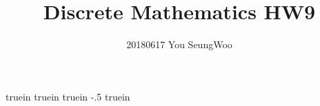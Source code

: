  truein 
 truein 
 truein 
\topmargin -.5 truein 
\textheight 8.5in
\setlength{\parindent}{0pt}
\hypersetup{
	colorlinks=true,
	linkcolor=red,
	filecolor=magenta,      
	urlcolor=cyan,
}


\title{Discrete Mathematics HW9}
\author{20180617 You SeungWoo}